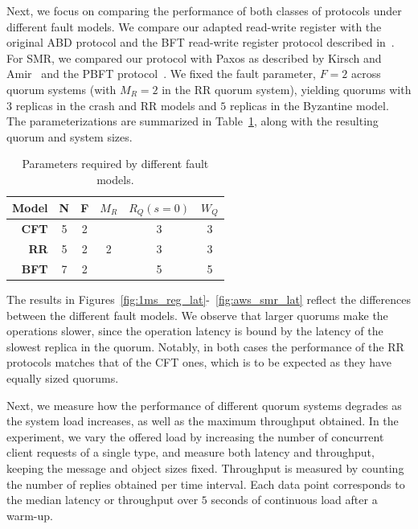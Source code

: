 Next, we focus on comparing the performance of both classes of protocols under different
fault models.
%
We compare our adapted read-write register with the original ABD
protocol and the \ac{BFT} read-write register protocol described
in~\cite{Malkhi:Reiter:BQS:98}. For SMR, we compared our protocol with
Paxos as described by Kirsch and Amir~\cite{paxos_builders} and the
PBFT protocol~\cite{pbft}. We fixed the fault parameter, $F= 2$ across
quorum systems (with $M_R=2$ in the \ac{RR} quorum system),
yielding quorums with $3$ replicas in the crash and
\ac{RR} models and $5$ replicas in the Byzantine model. The
parameterizations are summarized in
Table~\ref{table:quorum_sizes}, along with the resulting quorum
and system sizes.

\begin{table}[b]
    \centering
    \begin{tabular}{|r || c | c | c || c | c |}
        \hline
        \textbf{Model}       & N & F & $M_R$ & $R_Q(s = 0)$ & $W_Q$\\ \hline
        \textbf{\ac{CFT}}         & 5 & 2 &   &   3   &   3  \\
        \textbf{\ac{RR}} & 5 & 2 & 2 &   3   &   3  \\
        \textbf{\ac{BFT}}         & 7 & 2 &   &   5   &   5  \\ \hline
    \end{tabular}
    \caption{Parameters required by different fault models.}\label{table:quorum_sizes}
\end{table}

The results in Figures~\ref{fig:1ms_reg_lat}-~\ref{fig:aws_smr_lat}
reflect the differences between the different fault models.  We
observe that larger quorums make the operations slower, since the
operation latency is bound by the latency of the slowest replica in
the quorum. Notably, in both cases the performance of the
\ac{RR} protocols matches that of the \ac{CFT} ones, which is to be
expected as they have equally sized quorums.

Next, we measure how the performance of different quorum systems
degrades as the system load increases, as well as the maximum
throughput obtained. In the experiment, we vary the offered load by
increasing the number of concurrent client requests of a single type,
and measure both latency and throughput, keeping the message and
object sizes fixed. Throughput is measured by
counting the number of replies obtained per time interval.  Each
data point corresponds to the median latency or throughput over $5$
seconds of continuous load after a warm-up.
%

